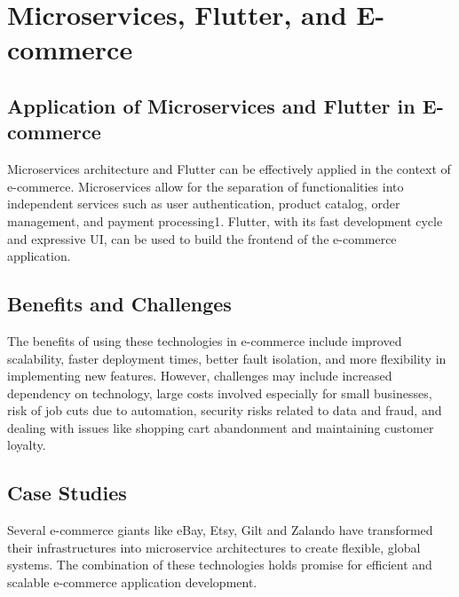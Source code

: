 \section{Microservices, Flutter, and E-commerce}

\subsection{Application of Microservices and Flutter in E-commerce}
Microservices architecture and Flutter can be effectively applied in the context of e-commerce. Microservices allow for the separation of functionalities into independent services such as user authentication, product catalog, order management, and payment processing1. Flutter, with its fast development cycle and expressive UI, can be used to build the frontend of the e-commerce application.

\subsection{Benefits and Challenges}
The benefits of using these technologies in e-commerce include improved scalability, faster deployment times, better fault isolation, and more flexibility in implementing new features. However, challenges may include increased dependency on technology, large costs involved especially for small businesses, risk of job cuts due to automation, security risks related to data and fraud, and dealing with issues like shopping cart abandonment and maintaining customer loyalty.

\subsection[]{Case Studies}
Several e-commerce giants like eBay, Etsy, Gilt and Zalando have transformed their infrastructures into microservice architectures to create flexible, global systems. The combination of these technologies holds promise for efficient and scalable e-commerce application development.